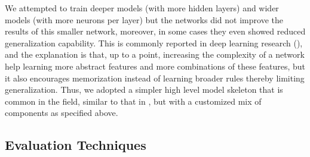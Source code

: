 \documentclass[12pt, a4paper]{article}
\begin{document}
We attempted to train deeper models (with more hidden layers) and wider models (with more neurons per layer) but the networks did not improve the results of this smaller network, moreover, in some cases they even showed reduced generalization capability. This is commonly reported in deep learning research (\cite{ObrienStack}), and the explanation is that, up to a point, increasing the complexity of a network help learning more abstract features and more combinations of these features, but it also encourages memorization instead of learning broader rules thereby limiting generalization. Thus, we adopted a simpler high level model skeleton that is common in the field, similar to that in \cite{sezer2018algorithmic}, but with a customized mix of components as specified above.

\subsection{Evaluation Techniques}
\label{subsec:DM:Eval}
\end{document}
